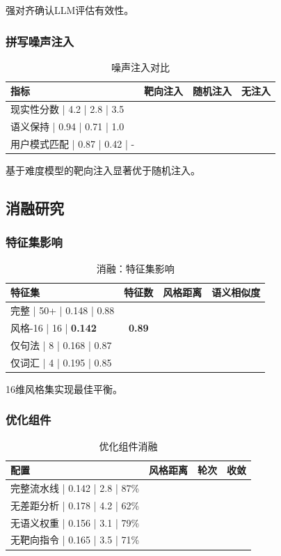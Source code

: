 \documentclass[11pt,a4paper]{article}
\begin{document}
强对齐确认LLM评估有效性。

\subsubsection{拼写噪声注入}

\begin{table}[h]
\centering
\begin{tabular}{lccc}
\toprule
\textbf{指标} & \textbf{靶向注入} & \textbf{随机注入} & \textbf{无注入} \\
\midrule
现实性分数 | 4.2 | 2.8 | 3.5 \\
语义保持 | 0.94 | 0.71 | 1.0 \\
用户模式匹配 | 0.87 | 0.42 | - \\
\bottomrule
\end{tabular}
\caption{噪声注入对比}
\label{tab:noise}
\end{table}

基于难度模型的靶向注入显著优于随机注入。

\subsection{消融研究}

\subsubsection{特征集影响}

\begin{table}[h]
\centering
\begin{tabular}{lccc}
\toprule
\textbf{特征集} & \textbf{特征数} & \textbf{风格距离} & \textbf{语义相似度} \\
\midrule
完整 | 50+ | 0.148 | 0.88 \\
风格-16 | 16 | \textbf{0.142} & \textbf{0.89} \\
仅句法 | 8 | 0.168 | 0.87 \\
仅词汇 | 4 | 0.195 | 0.85 \\
\bottomrule
\end{tabular}
\caption{消融：特征集影响}
\label{tab:ablation_features}
\end{table}

16维风格集实现最佳平衡。

\subsubsection{优化组件}

\begin{table}[h]
\centering
\begin{tabular}{lccc}
\toprule
\textbf{配置} & \textbf{风格距离} & \textbf{轮次} & \textbf{收敛} \\
\midrule
完整流水线 | 0.142 | 2.8 | 87\% \\
无差距分析 | 0.178 | 4.2 | 62\% \\
无语义权重 | 0.156 | 3.1 | 79\% \\
无靶向指令 | 0.165 | 3.5 | 71\% \\
\bottomrule
\end{tabular}
\caption{优化组件消融}
\label{tab:ablation_components}
\end{table}
\end{document}
